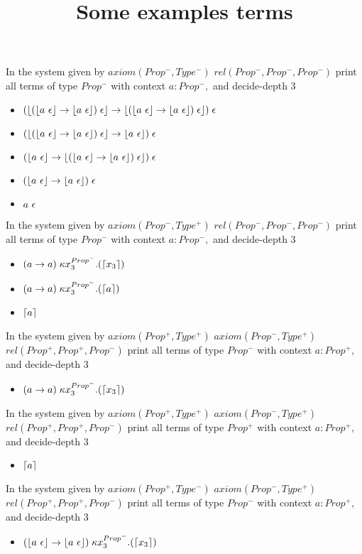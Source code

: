 \documentclass{scrartcl}
\title{Some examples terms}
\begin{document}
In the system given by $axiom (Prop^-,Type^-)$ $rel (Prop^-,Prop^-,Prop^-)$ print all terms of type $Prop^-$ with context ${a:Prop^-,}$ and decide-depth 3
\begin{itemize}
\item $ 
 (\left \lfloor (\left \lfloor a~\epsilon \right \rfloor \to \left \lfloor a~\epsilon \right \rfloor) \; \epsilon \right \rfloor \to \left \lfloor (\left \lfloor a~\epsilon \right \rfloor \to \left \lfloor a~\epsilon \right \rfloor) \; \epsilon \right \rfloor) \; \epsilon 
 $
\item $ 
 (\left \lfloor (\left \lfloor a~\epsilon \right \rfloor \to \left \lfloor a~\epsilon \right \rfloor) \; \epsilon \right \rfloor \to \left \lfloor a~\epsilon \right \rfloor) \; \epsilon 
 $
\item $ 
 (\left \lfloor a~\epsilon \right \rfloor \to \left \lfloor (\left \lfloor a~\epsilon \right \rfloor \to \left \lfloor a~\epsilon \right \rfloor) \; \epsilon \right \rfloor) \; \epsilon 
 $
\item $ 
 (\left \lfloor a~\epsilon \right \rfloor \to \left \lfloor a~\epsilon \right \rfloor) \; \epsilon 
 $
\item $ a~\epsilon $
\end{itemize}
In the system given by $axiom (Prop^-,Type^+)$ $rel (Prop^-,Prop^-,Prop^-)$ print all terms of type $Prop^-$ with context ${a:Prop^-,}$ and decide-depth 3
\begin{itemize}
\item $ (a \to a) \; \kappa x_3^{Prop^-}.(\left \lceil x_3 \right \rceil) $
\item $ (a \to a) \; \kappa x_3^{Prop^-}.(\left \lceil a \right \rceil) $
\item $ \left \lceil a \right \rceil $
\end{itemize}
In the system given by $axiom (Prop^+,Type^+)$ $axiom (Prop^-,Type^+)$ $rel (Prop^+,Prop^+,Prop^-)$ print all terms of type $Prop^-$ with context ${a:Prop^+,}$ and decide-depth 3
\begin{itemize}
\item $ (a \to a) \; \kappa x_3^{Prop^-}.(\left \lceil x_3 \right \rceil) $
\end{itemize}
In the system given by $axiom (Prop^+,Type^+)$ $axiom (Prop^-,Type^+)$ $rel (Prop^+,Prop^+,Prop^-)$ print all terms of type $Prop^+$ with context ${a:Prop^+,}$ and decide-depth 3
\begin{itemize}
\item $ \left \lceil a \right \rceil $
\end{itemize}
In the system given by $axiom (Prop^+,Type^-)$ $axiom (Prop^-,Type^+)$ $rel (Prop^+,Prop^+,Prop^-)$ print all terms of type $Prop^-$ with context ${a:Prop^+,}$ and decide-depth 3
\begin{itemize}
\item $ 
 (\left \lfloor a~\epsilon \right \rfloor \to \left \lfloor a~\epsilon \right \rfloor) \; \kappa x_3^{Prop^-}.(\left \lceil x_3 \right \rceil) 
 $
\end{itemize}
\end{document}
